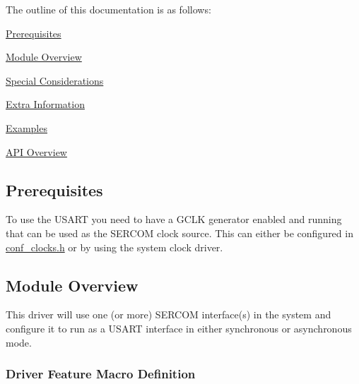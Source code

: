 The outline of this documentation is as follows\+:
\begin{DoxyItemize}
\item \hyperlink{group__asfdoc__sam0__sercom__usart__group_asfdoc_sam0_sercom_usart_prerequisites}{Prerequisites}
\item \hyperlink{group__asfdoc__sam0__sercom__usart__group_asfdoc_sam0_sercom_usart_overview}{Module Overview}
\item \hyperlink{group__asfdoc__sam0__sercom__usart__group_asfdoc_sam0_sercom_usart_special_considerations}{Special Considerations}
\item \hyperlink{group__asfdoc__sam0__sercom__usart__group_asfdoc_sam0_sercom_usart_extra_info}{Extra Information}
\item \hyperlink{group__asfdoc__sam0__sercom__usart__group_asfdoc_sam0_sercom_usart_examples}{Examples}
\item \hyperlink{group__asfdoc__sam0__sercom__usart__group_asfdoc_sam0_sercom_usart_api_overview}{A\+P\+I Overview}
\end{DoxyItemize}\hypertarget{group__asfdoc__sam0__sercom__usart__group_asfdoc_sam0_sercom_usart_prerequisites}{}\subsection{Prerequisites}\label{group__asfdoc__sam0__sercom__usart__group_asfdoc_sam0_sercom_usart_prerequisites}
To use the U\+S\+A\+R\+T you need to have a G\+C\+L\+K generator enabled and running that can be used as the S\+E\+R\+C\+O\+M clock source. This can either be configured in \hyperlink{conf__clocks_8h}{conf\+\_\+clocks.\+h} or by using the system clock driver.\hypertarget{group__asfdoc__sam0__sercom__usart__group_asfdoc_sam0_sercom_usart_overview}{}\subsection{Module Overview}\label{group__asfdoc__sam0__sercom__usart__group_asfdoc_sam0_sercom_usart_overview}
This driver will use one (or more) S\+E\+R\+C\+O\+M interface(s) in the system and configure it to run as a U\+S\+A\+R\+T interface in either synchronous or asynchronous mode.\hypertarget{group__asfdoc__sam0__sercom__usart__group_asfdoc_sam0_sercom_usart_features}{}\subsubsection{Driver Feature Macro Definition}\label{group__asfdoc__sam0__sercom__usart__group_asfdoc_sam0_sercom_usart_features}

